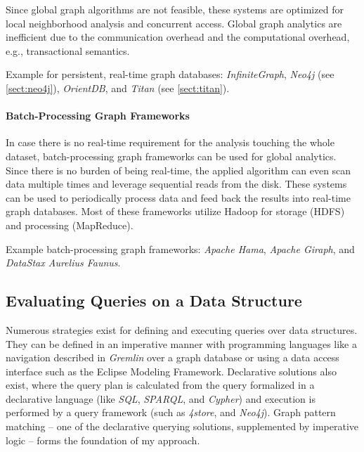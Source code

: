 Since global graph algorithms are not feasible, these systems are optimized for local neighborhood analysis and concurrent access. Global graph analytics are inefficient due to the communication overhead and the computational overhead, e.g., transactional semantics.

Example for persistent, real-time graph databases: \emph{InfiniteGraph}, \emph{Neo4j} (see \cref{sect:neo4j}), \emph{OrientDB}, and \emph{Titan} (see \cref{sect:titan}).

\paragraph{Batch-Processing Graph Frameworks}
In case there is no real-time requirement for the analysis touching the whole dataset, batch-processing graph frameworks can be used for global analytics. Since there is no burden of being real-time, the applied algorithm can even scan data multiple times and leverage sequential reads from the disk. These systems can be used to periodically process data and feed back the results into real-time graph databases. Most of these frameworks utilize Hadoop for storage (HDFS) and processing (MapReduce).

Example batch-processing graph frameworks: \emph{Apache Hama}, \emph{Apache Giraph}, and \emph{DataStax Aurelius Faunus}.


\subsection{Evaluating Queries on a Data Structure}
Numerous strategies exist for defining and executing queries over data structures. They can be defined in an imperative manner with programming languages like a navigation described in \emph{Gremlin} over a graph database or using a data access interface such as the Eclipse Modeling Framework. Declarative solutions also exist, where the query plan is calculated from the query formalized in a declarative language (like \emph{SQL}, \emph{SPARQL}, and \emph{Cypher}) and execution is performed by a query framework (such as \emph{4store}, and \emph{Neo4j}). Graph pattern matching -- one of the declarative querying solutions, supplemented by imperative logic -- forms the foundation of my approach.

